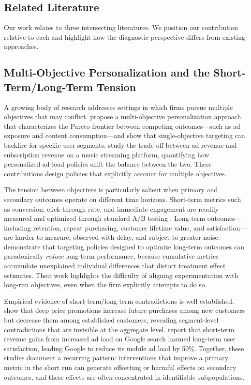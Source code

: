 \documentclass[11pt,letterpaper,english]{article}
\theoremstyle{definition}
\theoremstyle{definition}
\begin{document}
\begin{bibunit}
\section{Related Literature}
\label{sec:related_lit}

Our work relates to three intersecting literatures. We position our contribution relative to each and highlight how the diagnostic perspective differs from existing approaches.

\subsection{Multi-Objective Personalization and the Short-Term/Long-Term Tension}
\label{sec:lit-multiobj}

A growing body of research addresses settings in which firms pursue multiple objectives that may conflict. \citet{rafieian2025multiobjective} propose a multi-objective personalization approach that characterizes the Pareto frontier between competing outcomes---such as ad exposure and content consumption---and show that single-objective targeting can backfire for specific user segments. \citet{goli2025personalizing} study the trade-off between ad revenue and subscription revenue on a music streaming platform, quantifying how personalized ad-load policies shift the balance between the two. These contributions design policies that explicitly account for multiple objectives.

The tension between objectives is particularly salient when primary and secondary outcomes operate on different time horizons. Short-term metrics such as conversion, click-through rate, and immediate engagement are readily measured and optimized through standard A/B testing \citep{kohavi2012trustworthy, feit2019testandroll}. Long-term outcomes---including retention, repeat purchasing, customer lifetime value, and satisfaction---are harder to measure, observed with delay, and subject to greater noise. \citet{ascarza2024doingmore} demonstrate that targeting policies designed to optimize long-term outcomes can paradoxically \emph{reduce} long-term performance, because cumulative metrics accumulate unexplained individual differences that distort treatment effect estimates. Their work highlights the difficulty of aligning experimentation with long-run objectives, even when the firm explicitly attempts to do so.

Empirical evidence of short-term/long-term contradictions is well established. \citet{anderson2004longrun} show that deep price promotions increase future purchases among new customers but decrease them among established customers, revealing segment-level contradictions that are invisible at the aggregate level. \citet{hohnhold2015focusing} report that short-term revenue gains from increased ad load on Google search harmed long-term user satisfaction, leading Google to reduce its mobile ad load by 50\%. Together, these studies document a recurring pattern: interventions that improve a primary metric in the short run can generate offsetting or harmful effects on secondary outcomes, and these effects are often concentrated in identifiable subpopulations.


\end{bibunit}
\end{document}
